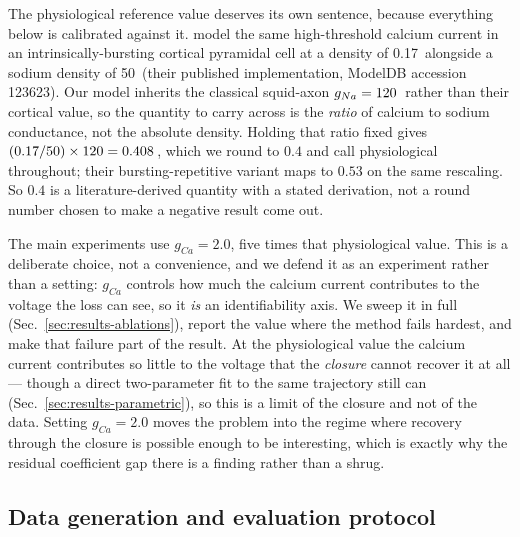 \documentclass{article}
\newcommand{\gcaMain}{2.0}     %
\newcommand{\gcaPhys}{0.4}     %
\newcommand{\gcaLit}{0.17}     %
\newcommand{\gNaLit}{50}       %
\newcommand{\gcaRescaled}{0.408}  %
\newcommand{\gcaRescaledIBR}{0.53} %
\begin{document}
The physiological reference value deserves its own sentence, because everything
below is calibrated against it. \citet{pospischil2008} model the same
\citet{reuveni1993} high-threshold calcium current in an intrinsically-bursting
cortical pyramidal cell at a density of \gcaLit\, alongside a
sodium density of \gNaLit\, (their published implementation,
ModelDB accession 123623). %
Our model inherits the classical squid-axon $g_{Na}=120$\,
rather than their cortical value, so the quantity to carry across is the
\emph{ratio} of calcium to sodium conductance, not the absolute density. Holding
that ratio fixed gives
$(\gcaLit/\gNaLit)\times\mgNa = \gcaRescaled$\,, which we
round to $\gcaPhys$ and call physiological throughout; their
bursting-repetitive variant maps to $\gcaRescaledIBR$ on the same rescaling.
So $\gcaPhys$ is a literature-derived quantity with a stated derivation, not a
round number chosen to make a negative result come out.

The main experiments use $g_{Ca}=\gcaMain$, five times that physiological value.
This is a deliberate choice, not a convenience, and we defend
it as an experiment rather than a setting: $g_{Ca}$ controls how much the calcium
current contributes to the voltage the loss can see, so it \emph{is} an
identifiability axis. We sweep it in full (Sec.~\ref{sec:results-ablations}),
report the value where the method fails hardest, and make that failure part of
the result. At the physiological value the calcium current contributes so little
to the voltage that the \emph{closure} cannot recover it at all --- though a
direct two-parameter fit to the same trajectory still can
(Sec.~\ref{sec:results-parametric}), so this is a limit of the closure and not of
the data. Setting $g_{Ca}=\gcaMain$ moves the problem into the regime where
recovery through the closure is possible enough to be interesting, which is
exactly why the residual coefficient gap there is a finding rather than a shrug.

\subsection{Data generation and evaluation protocol}
\label{sec:setup-data}
\end{document}
